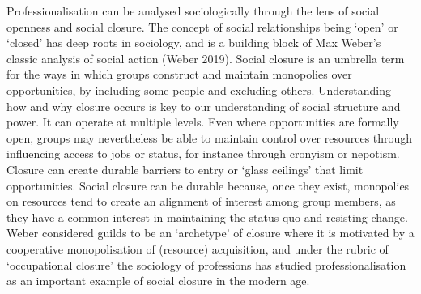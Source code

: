 \documentclass[
  a4paper,
]{book}
\begin{document}
Professionalisation can be analysed sociologically through the lens of
social openness and social closure. The concept of social relationships
being `open' or `closed' has deep roots in sociology, and is a building
block of Max Weber's classic analysis of social action (Weber 2019).
Social closure is an umbrella term for the ways in which groups
construct and maintain monopolies over opportunities, by including some
people and excluding others. Understanding how and why closure occurs is
key to our understanding of social structure and power. It can operate
at multiple levels. Even where opportunities are formally open, groups
may nevertheless be able to maintain control over resources through
influencing access to jobs or status, for instance through cronyism or
nepotism. Closure can create durable barriers to entry or `glass
ceilings' that limit opportunities. Social closure can be durable
because, once they exist, monopolies on resources tend to create an
alignment of interest among group members, as they have a common
interest in maintaining the status quo and resisting change. Weber
considered guilds to be an `archetype' of closure where it is motivated
by a cooperative monopolisation of (resource) acquisition, and under the
rubric of `occupational closure' the sociology of professions has
studied professionalisation as an important example of social closure in
the modern age.
\end{document}
